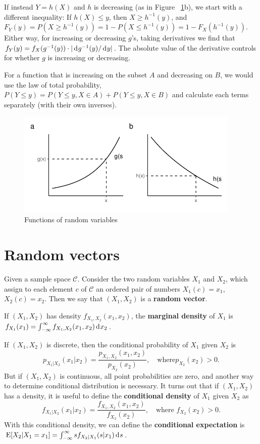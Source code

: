 \documentclass[twoside]{article}
\begin{document}
If instead $Y=h(X)$ and $h$ is decreasing (as in Figure ~\ref{fig:frv}b), we
start with a different inequality: If $h(X) \leq y$, then $X\geq h^{-1}(y)$,
and $F_Y(y) = P(X\geq h^{-1}(y)) = 1 - P(X\leq h^{-1}(y)) = 1 - F_X(h^{-1}(y))$.
Either way, for increasing or decreasing $g$'s, taking derivatives we find that 
$f_Y(y) = f_X(g^{-1}(y)) \cdot | \rd g^{-1}(y)/\rd y|$.
The absolute value of the derivative controls for whether $g$ is increasing or decreasing.

For a function that is increasing on the subset $A$ and decreasing on $B$, we would use the
law of total probability, $P(Y\leq y)= P(Y\leq y , X\in A) + P(Y\leq y , X\in B)$ and 
calculate each terms separately (with their own inverses). 

\begin{figure}[tb]
\includegraphics[width=0.95\textwidth]{../graphs/transformation_of_RV}

\caption{Functions of random variables}\label{fig:frv}
\end{figure}



\section{Random vectors}
Given a sample space $\mathcal{C}$. Consider the
two random variables $X_1$ and $X_2$, which assign to each element
$c$ of $\mathcal{C}$ an ordered pair of numbers
$X_1(c)=x_1$, $X_2(c)=x_2$. Then we say that $(X_1,X_2)$ is a
\textbf{random vector}. 

If $(X_1,X_2)$ has density $f_{X_1,X_2}(x_1,x_2)$, the \textbf{marginal density}
of $X_1$ is  $ f_{X_1}(x_1) = \int_{-\infty}^\infty f_{X_1,X_2}(x_1,x_2)\rd x_2$.

If $(X_1,X_2)$ is discrete, then the conditional probability of $X_1$ given $X_2$ is
\[ p_{X_1|X_2}(x_1|x_2) = \frac{p_{X_1,X_2}(x_1,x_2)}{p_{X_2}(x_2)}, \quad \text{where
$p_{X_2}(x_2)>0$}.\] But if $(X_1,X_2)$ is continuous, all point probabilities are
zero, and another way to determine conditional distribution is necessary. It
turns out that if $(X_1,X_2)$ has a density, it is useful to define the
\textbf{conditional density} of $X_1$ given $X_2$ as
\[f_{X_1|X_2}(x_1|x_2)=\frac{f_{X_1,X_2}(x_1,x_2)}{f_{X_2}(x_2)},\quad \text{where $f_{X_2}(x_2)>0$}.\]
With this conditional density, we can define
the \textbf{conditional expectation} is $\E[X_2|X_1=x_1] = \int_{-\infty}^\infty s
f_{X_2|X_1}(s|x_1) \rd s$.
\end{document}
